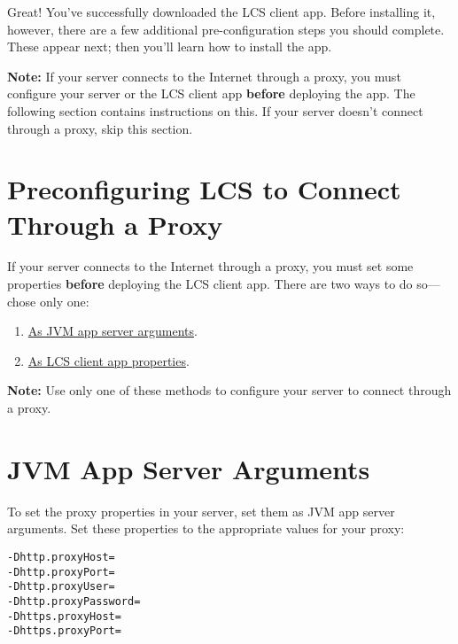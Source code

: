 Great! You've successfully downloaded the LCS client app. Before
installing it, however, there are a few additional pre-configuration
steps you should complete. These appear next; then you'll learn how to
install the app.

\noindent\hrulefill

\textbf{Note:} If your server connects to the Internet through a proxy,
you must configure your server or the LCS client app \textbf{before}
deploying the app. The following section contains instructions on this.
If your server doesn't connect through a proxy, skip this section.

\noindent\hrulefill

\section{Preconfiguring LCS to Connect Through a
Proxy}\label{preconfiguring-lcs-to-connect-through-a-proxy}

If your server connects to the Internet through a proxy, you must set
some properties \textbf{before} deploying the LCS client app. There are
two ways to do so---chose only one:

\begin{enumerate}
\def\labelenumi{\arabic{enumi}.}
\item
  \hyperref[jvm-app-server-arguments]{As JVM app server arguments}.
\item
  \hyperref[lcs-client-app-properties]{As LCS client app properties}.
\end{enumerate}

\noindent\hrulefill

\textbf{Note:} Use only one of these methods to configure your server to
connect through a proxy.

\noindent\hrulefill

\section{JVM App Server Arguments}\label{jvm-app-server-arguments}

To set the proxy properties in your server, set them as JVM app server
arguments. Set these properties to the appropriate values for your
proxy:

\begin{verbatim}
-Dhttp.proxyHost=
-Dhttp.proxyPort=
-Dhttp.proxyUser=
-Dhttp.proxyPassword=
-Dhttps.proxyHost=
-Dhttps.proxyPort=
\end{verbatim}

